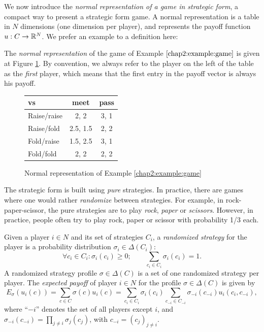 We now introduce the
 \emph{normal representation of a game in strategic form},
a compact way to present a strategic form game.
A normal representation is a table in $N$ dimensions
 (one dimension per player),
 and represents the payoff function
 $u : C \rightarrow \mathbb{R}^N$.
 We prefer an example to a definition here:
\begin{example}
The \emph{normal representation} of the game of Example $\ref{chap2:example:game}$ is given at Figure \ref{chap2:table}.
By convention, we always refer to the player on the left of the table as the \emph{first} player,
which means that the first entry in the payoff vector is always his payoff.
\begin{figure}[!ht]
\centering
\begin{tabular}{l|cc}
\TAtwo{} vs \TAone{} & meet & pass \\
\hline
Raise/raise & 2, 2 & 3, 1 \\
Raise/fold & 2.5, 1.5 & 2, 2 \\
Fold/raise & 1.5, 2.5 & 3, 1 \\
Fold/fold & 2, 2 & 2, 2
\end{tabular}
\caption{Normal representation of Example \ref{chap2:example:game}}
\label{chap2:table}
\end{figure}

\end{example}

The strategic form is built using \emph{pure} strategies. In practice, there are games where one would rather \emph{randomize} between strategies.
For example,  in rock-paper-scissor, the pure strategies are to play \emph{rock},  \emph{paper} or \emph{scissors}. However, in practice, people often try to play rock, paper or scissor with probability 1/3 each.

\begin{definition}
Given a player $i \in N$ and its set of strategies $C_i$, a \emph{randomized strategy} for the player is a probability distribution $\sigma_i \in \Delta(C_i)$:
$$ \forall c_i \in C_i: \sigma_i(c_i) \geq 0; \qquad \sum_{c_i \in C_i} \sigma_i(c_i) = 1.$$
A randomized strategy profile $\sigma \in \Delta(C)$ is a set of one randomized strategy per player.
The \emph{expected payoff} of player $i \in N$ for the profile $\sigma \in \Delta(C)$ is given by
$$E_\sigma(u_i(c)) = \sum_{c \in C} \sigma(c) u_i(c)= \sum_{c_i \in C_i} \sigma_i(c_i) \sum_{c_{-i} \in C_{-i}} \sigma_{-i}(c_{-i}) u_i(c_i, c_{-i}), $$
where ``$-i$'' denotes the set of all players except $i$, and
$\sigma_{-i}(c_{-i}) = \prod_{j \neq i}\sigma_{j}(c_j)$, with $c_{-i} = (c_j)_{j \neq i}$.
\end{definition}


